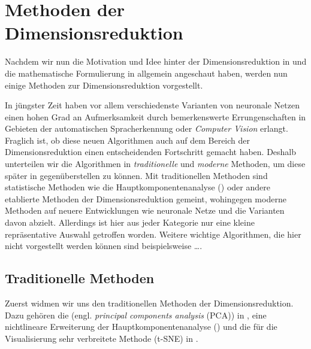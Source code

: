 \chapter{Methoden der Dimensionsreduktion}
\label{ch:MethodenDerDimRed}

Nachdem wir nun die Motivation und Idee hinter der Dimensionsreduktion in 
und die mathematische Formulierung in  allgemein angeschaut haben,
werden nun einige Methoden zur Dimensionsreduktion vorgestellt.

In jüngster Zeit haben vor allem verschiedenste Varianten von neuronale Netzen einen hohen Grad an
Aufmerksamkeit durch bemerkenswerte Errungenschaften in Gebieten der automatischen Spracherkennung
oder \textit{Computer Vision} erlangt. Fraglich ist, ob diese neuen Algorithmen auch auf dem
Bereich der Dimensionsreduktion einen entscheidenden Fortschritt gemacht haben. Deshalb unterteilen
wir die Algorithmen in \textit{traditionelle} und \textit{moderne} Methoden, um diese später in
 gegenüberstellen zu können. Mit traditionellen Methoden sind statistische
Methoden wie die Hauptkomponentenanalyse () oder
andere etablierte Methoden der Dimensionsreduktion gemeint, wohingegen moderne Methoden auf neuere
Entwicklungen wie neuronale Netze und die Varianten davon abzielt. Allerdings ist hier aus jeder
Kategorie nur eine kleine repräsentative Auswahl getroffen worden. Weitere wichtige Algorithmen,
die hier nicht vorgestellt werden können sind beispielsweise \dots {}.

\section{Traditionelle Methoden}
\label{ch:MethodenDerDimRed:traditionell}

Zuerst widmen wir uns den traditionellen Methoden der Dimensionsreduktion. Dazu gehören die
 (engl. \textit{principal components analysis} (PCA)) in
, eine nichtlineare Erweiterung der
Hauptkomponentenanalyse () und die für die
Visualisierung sehr verbreitete Methode 
(t-SNE) in .

